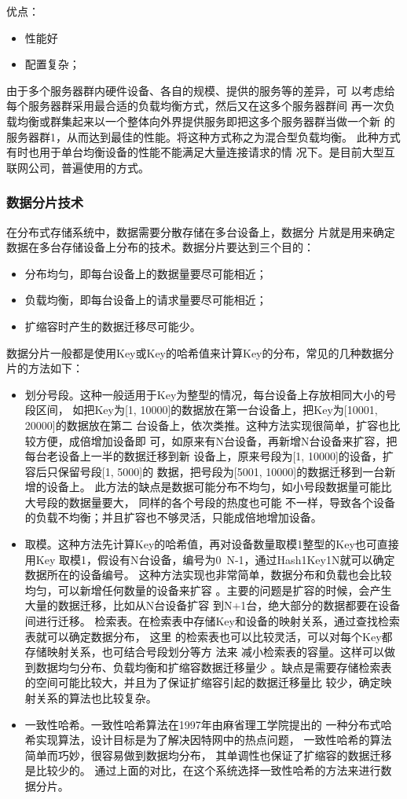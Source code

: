 优点：
\begin{itemize}
\item 性能好
\item 配置复杂；
\end{itemize}

由于多个服务器群内硬件设备、各自的规模、提供的服务等的差异，可
以考虑给每个服务器群采用最合适的负载均衡方式，然后又在这多个服务器群间
再一次负载均衡或群集起来以一个整体向外界提供服务即把这多个服务器群当做一个新
的服务器群1，从而达到最佳的性能。将这种方式称之为混合型负载均衡。
此种方式有时也用于单台均衡设备的性能不能满足大量连接请求的情
况下。是目前大型互联网公司，普遍使用的方式。
\subsubsection{数据分片技术}
在分布式存储系统中，数据需要分散存储在多台设备上，数据分
片就是用来确定数据在多台存储设备上分布的技术。数据分片要达到三个目的：
\begin{itemize}
\item 分布均匀，即每台设备上的数据量要尽可能相近；
\item 负载均衡，即每台设备上的请求量要尽可能相近；
\item 扩缩容时产生的数据迁移尽可能少。
\end{itemize}

数据分片一般都是使用Key或Key的哈希值来计算Key的分布，常见的几种数据分片的方法如下：
\begin{itemize}
\item 划分号段。这种一般适用于Key为整型的情况，每台设备上存放相同大小的号段区间，
如把Key为[1, 10000]的数据放在第一台设备上，把Key为[10001, 20000]的数据放在第二
台设备上，依次类推。这种方法实现很简单，扩容也比较方便，成倍增加设备即
可，如原来有N台设备，再新增N台设备来扩容，把每台老设备上一半的数据迁移到新
设备上，原来号段为[1, 10000]的设备，扩容后只保留号段[1, 5000]的
数据，把号段为[5001, 10000]的数据迁移到一台新增的设备上。
此方法的缺点是数据可能分布不均匀，如小号段数据量可能比大号段的数据量要大，
同样的各个号段的热度也可能
不一样，导致各个设备的负载不均衡；并且扩容也不够灵活，只能成倍地增加设备。

\item 取模。这种方法先计算Key的哈希值，再对设备数量取模1整型的Key也可直接用Key
取模1，假设有N台设备，编号为0~N-1，通过Hash1Key1N就可以确定数据所在的设备编号。
这种方法实现也非常简单，数据分布和负载也会比较均匀，可以新增任何数量的设备来扩容
。主要的问题是扩容的时候，会产生大量的数据迁移，比如从N台设备扩容
到N+1台，绝大部分的数据都要在设备间进行迁移。
检索表。在检索表中存储Key和设备的映射关系，通过查找检索表就可以确定数据分布，
这里
的检索表也可以比较灵活，可以对每个Key都存储映射关系，也可结合号段划分等方
法来
减小检索表的容量。这样可以做到数据均匀分布、负载均衡和扩缩容数据迁移量少
。缺点是需要存储检索表的空间可能比较大，并且为了保证扩缩容引起的数据迁移量比
较少，确定映射关系的算法也比较复杂。

\item 一致性哈希。一致性哈希算法在1997年由麻省理工学院提出的
一种分布式哈希实现算法，设计目标是为了解决因特网中的热点问题，
一致性哈希的算法简单而巧妙，很容易做到数据均分布，
其单调性也保证了扩缩容的数据迁移是比较少的。
通过上面的对比，在这个系统选择一致性哈希的方法来进行数据分片。
\end{itemize}
